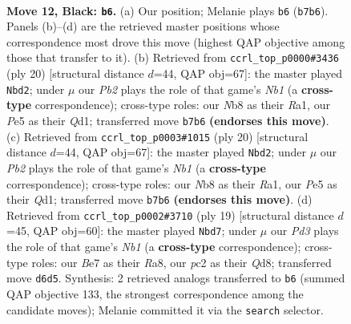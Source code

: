 \documentclass[11pt]{article}
\begin{document}
\clearpage

\begin{figure}[p]\centering
\begin{subfigure}{0.46\textwidth}\centering
\resizebox{\linewidth}{!}{%
\newchessgame
\chessboard[
  setfen={1nbq1rk1/rp2bppp/p2p1n2/4p3/PP2P3/2NB1N2/2P2PPP/R1BQ1RK1 b - - 0 12},
  showmover=false,
  pgfstyle=straightmove, color=movearrow, markmove={b7-b6}
]}
\caption{}
\end{subfigure}\hfill
\begin{subfigure}{0.46\textwidth}\centering
\resizebox{\linewidth}{!}{%
\newchessgame
\chessboard[
  setfen={r1bqr1k1/1pp2ppp/1nnb4/p3p3/8/PP1P1NP1/1B2PPBP/RN1Q1RK1 w - - 0 11},
  showmover=false,
  pgfstyle=straightmove, color=movearrow, markmove={b1-d2}
]}
\caption{}
\end{subfigure}
\\[4pt]
\begin{subfigure}{0.46\textwidth}\centering
\resizebox{\linewidth}{!}{%
\newchessgame
\chessboard[
  setfen={r1bqr1k1/1pp2ppp/1nnb4/p3p3/8/PP1P1NP1/1B2PPBP/RN1Q1RK1 w - - 0 11},
  showmover=false,
  pgfstyle=straightmove, color=movearrow, markmove={b1-d2}
]}
\caption{}
\end{subfigure}\hfill
\begin{subfigure}{0.46\textwidth}\centering
\resizebox{\linewidth}{!}{%
\newchessgame
\chessboard[
  setfen={rn1q1rk1/ppp1b1pp/3p1nb1/3P4/2N1p3/2N5/PPP1BPPP/R1BQ1RK1 b - - 6 10},
  showmover=false,
  pgfstyle=straightmove, color=movearrow, markmove={b8-d7}
]}
\caption{}
\end{subfigure}
\caption{\textbf{Move 12, Black: \texttt{b6}.} (a) Our position; Melanie plays \texttt{b6} (\texttt{b7b6}). Panels (b)--(d) are the retrieved master positions whose correspondence most drove this move (highest QAP objective among those that transfer to it). (b) Retrieved from \texttt{ccrl\_top\_p0000\#3436} (ply 20) [structural distance $d$=44, QAP obj=67]: the master played \texttt{Nbd2}; under $\mu$ our \emph{Pb2} plays the role of that game's \emph{Nb1} (a \textbf{cross-type} correspondence); cross-type roles: our \emph{N}b8 as their \emph{R}a1, our \emph{P}e5 as their \emph{Q}d1; transferred move \texttt{b7b6} \textbf{(endorses this move)}. (c) Retrieved from \texttt{ccrl\_top\_p0003\#1015} (ply 20) [structural distance $d$=44, QAP obj=67]: the master played \texttt{Nbd2}; under $\mu$ our \emph{Pb2} plays the role of that game's \emph{Nb1} (a \textbf{cross-type} correspondence); cross-type roles: our \emph{N}b8 as their \emph{R}a1, our \emph{P}e5 as their \emph{Q}d1; transferred move \texttt{b7b6} \textbf{(endorses this move)}. (d) Retrieved from \texttt{ccrl\_top\_p0002\#3710} (ply 19) [structural distance $d$=45, QAP obj=60]: the master played \texttt{Nbd7}; under $\mu$ our \emph{Pd3} plays the role of that game's \emph{Nb1} (a \textbf{cross-type} correspondence); cross-type roles: our \emph{B}e7 as their \emph{R}a8, our \emph{p}c2 as their \emph{Q}d8; transferred move \texttt{d6d5}. Synthesis: 2 retrieved analogs transferred to \texttt{b6} (summed QAP objective 133, the strongest correspondence among the candidate moves); Melanie committed it via the \texttt{search} selector.}
\label{fig:thought-m23}
\end{figure}
\end{document}
